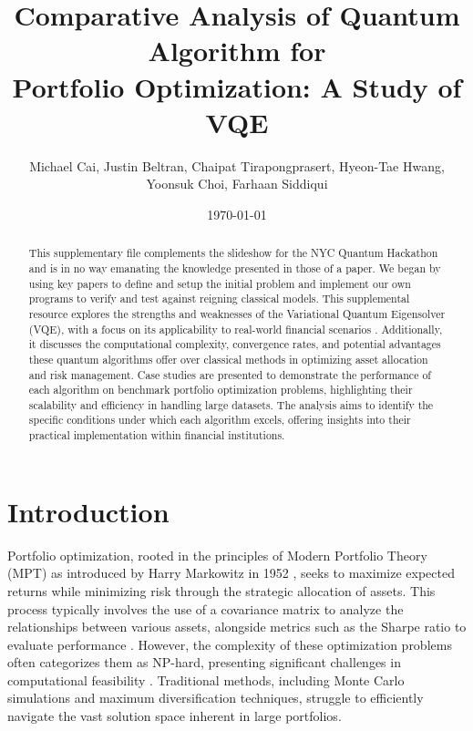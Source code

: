 \documentclass[%
 reprint,
 amsmath,amssymb,
 aps,
]{revtex4-2}
\begin{document}

\title{Comparative Analysis of Quantum Algorithm for \\Portfolio Optimization: A Study of VQE}%

\author{Michael Cai, Justin Beltran, Chaipat Tirapongprasert, Hyeon-Tae Hwang, Yoonsuk Choi, Farhaan Siddiqui}


\date{\today}
\begin{abstract}
This supplementary file complements the slideshow for the NYC Quantum Hackathon and is in no way emanating the knowledge presented in those of a paper. We began by using key papers to define and setup the initial problem and implement our own programs to verify and test against reigning classical models. This supplemental resource explores the strengths and weaknesses of the Variational Quantum Eigensolver (VQE), with a focus on its applicability to real-world financial scenarios \cite{Cerezo2021}. Additionally, it discusses the computational complexity, convergence rates, and potential advantages these quantum algorithms offer over classical methods in optimizing asset allocation and risk management. Case studies are presented to demonstrate the performance of each algorithm on benchmark portfolio optimization problems, highlighting their scalability and efficiency in handling large datasets. The analysis aims to identify the specific conditions under which each algorithm excels, offering insights into their practical implementation within financial institutions.
\end{abstract}

\maketitle


\section{\label{sec:level1}Introduction%
}
Portfolio optimization, rooted in the principles of Modern Portfolio Theory (MPT) as introduced by Harry Markowitz in 1952 \cite{Markowitz1952}, seeks to maximize expected returns while minimizing risk through the strategic allocation of assets. This process typically involves the use of a covariance matrix to analyze the relationships between various assets, alongside metrics such as the Sharpe ratio to evaluate performance \cite{Sharpe1964}. However, the complexity of these optimization problems often categorizes them as NP-hard, presenting significant challenges in computational feasibility \cite{Boyd2004}. Traditional methods, including Monte Carlo simulations and maximum diversification techniques, struggle to efficiently navigate the vast solution space inherent in large portfolios.
\end{document}
